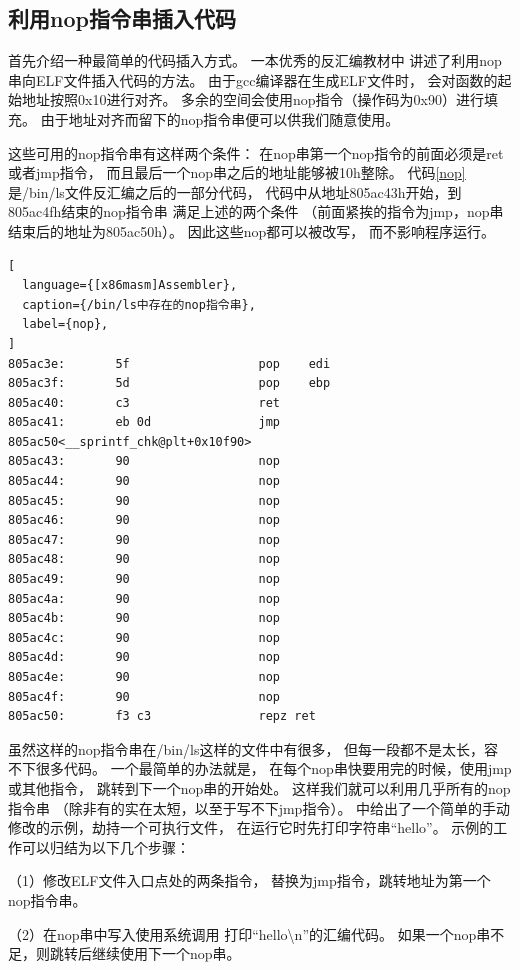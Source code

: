 \subsection{利用nop指令串插入代码}
\label{nopinjection}

首先介绍一种最简单的代码插入方式。
一本优秀的反汇编教材\cite{heike}中
讲述了利用nop串向ELF文件插入代码的方法。
由于gcc编译器在生成ELF文件时，
会对函数的起始地址按照0x10进行对齐。
多余的空间会使用nop指令（操作码为0x90）进行填充。
由于地址对齐而留下的nop指令串便可以供我们随意使用。

这些可用的nop指令串有这样两个条件：
在nop串第一个nop指令的前面必须是ret或者jmp指令，
而且最后一个nop串之后的地址能够被10h整除。
代码\ref{nop}是/bin/ls文件反汇编之后的一部分代码，
代码中从地址805ac43h开始，到805ac4fh结束的nop指令串
满足上述的两个条件
（前面紧挨的指令为jmp，nop串结束后的地址为805ac50h）。
因此这些nop都可以被改写，
而不影响程序运行。

\begin{lstlisting}[
  language={[x86masm]Assembler},
  caption={/bin/ls中存在的nop指令串},
  label={nop},
]
805ac3e:       5f                  pop    edi
805ac3f:       5d                  pop    ebp
805ac40:       c3                  ret
805ac41:       eb 0d               jmp    805ac50<__sprintf_chk@plt+0x10f90>
805ac43:       90                  nop
805ac44:       90                  nop
805ac45:       90                  nop
805ac46:       90                  nop
805ac47:       90                  nop
805ac48:       90                  nop
805ac49:       90                  nop
805ac4a:       90                  nop
805ac4b:       90                  nop
805ac4c:       90                  nop
805ac4d:       90                  nop
805ac4e:       90                  nop
805ac4f:       90                  nop
805ac50:       f3 c3               repz ret
\end{lstlisting}

虽然这样的nop指令串在/bin/ls这样的文件中有很多，
但每一段都不是太长，容不下很多代码。
一个最简单的办法就是，
在每个nop串快要用完的时候，使用jmp或其他指令，
跳转到下一个nop串的开始处。
这样我们就可以利用几乎所有的nop指令串
（除非有的实在太短，以至于写不下jmp指令）。
\cite{heike}中给出了一个简单的手动修改的示例，劫持一个可执行文件，
在运行它时先打印字符串“hello”。
示例的工作可以归结为以下几个步骤：

（1）修改ELF文件入口点处的两条指令，
替换为jmp指令，跳转地址为第一个nop指令串。

（2）在nop串中写入使用系统调用
打印“hello\textbackslash n”的汇编代码。
如果一个nop串不足，则跳转后继续使用下一个nop串。


